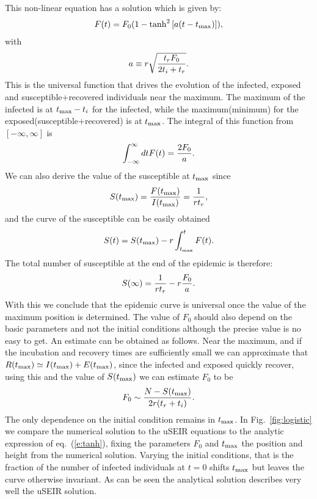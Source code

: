\documentclass[a4paper,oneside,11pt]{article}
\begin{document}
 This non-linear equation has a solution which is given by:
\begin{eqnarray}
F(t) = F_0 \large(1 - \tanh^2\left[ a (t-t_{\rm max})\right]\large),
\label{eq:tanh}
\end{eqnarray}
with
\begin{eqnarray}
a\equiv r \sqrt{{t_r F_0\over 2 t_i+t_r}}.
\end{eqnarray}
This is the universal function that drives the evolution of the infected, exposed and susceptible+recovered individuals near the maximum. The maximum of the infected is at $t_{\rm max}-t_i$ for the infected, while the maximum(minimum) for the exposed(susceptible+recovered) is at $t_{\rm max}$. The integral of this function from $[-\infty, \infty]$ is
\begin{eqnarray}
\int_{-\infty}^{\infty} dt F(t) = {2 F_0 \over a}.
\end{eqnarray}
We can also derive the value of the susceptible at $t_{\rm max}$ since
\begin{eqnarray}
S(t_{\rm max}) = {F(t_{\rm max}) \over I(t_{\rm max})} = {1  \over r t_r},
\end{eqnarray}
and the curve of the susceptible can be easily obtained
\begin{eqnarray}
S(t) = S(t_{\rm max}) - r \int_{t_{\rm max}}^t F(t).
\end{eqnarray}
The total number of susceptible at the end of the epidemic is therefore:
\begin{eqnarray}
S(\infty) = {1\over r t_r } - r {F_0\over a}.
\end{eqnarray}
With this we conclude that the epidemic curve is universal once the value of the maximum position is determined. The value of $F_0$ should also
depend on the basic parameters and not the initial conditions although
the precise value is no easy to get. An estimate can be obtained as follows. Near the maximum, and if the incubation and recovery times are sufficiently small we can approximate that $R(t_{\rm max}) \simeq I(t_{\rm max}) + E(t_{\rm max})$, since the infected and exposed quickly recover, using this and the value of $S(t_{\rm max})$ we can estimate $F_0$ to be
\begin{eqnarray}
F_0 \sim {N-S(t_{\rm max})\over 2 r (t_r +  t_i)}.
\end{eqnarray}
The only dependence on the initial condition remains in $t_{\rm max}$.
In Fig.~\ref{fig:logistic} we compare the numerical solution to the uSEIR equations to the analytic expression of eq.~(\ref{e:tanh}), fixing the parameters $F_0$ and $t_{\rm max}$  the position and height from the numerical solution. Varying the initial conditions, that is the fraction of the number of infected individuals at $t=0$ shifts $t_{\rm max}$ but leaves the curve otherwise invariant. As can be seen the analytical solution describes very well the uSEIR solution.
\end{document}
